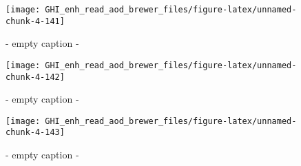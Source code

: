 \documentclass[
  10pt,
  a4paper,oneside]{article}
\begin{document}
\begin{figure}[H]

{\centering \texttt{[image: GHI\_enh\_read\_aod\_brewer\_files/figure-latex/unnamed-chunk-4-141]} 

}

\caption{ - empty caption - }\label{fig:unnamed-chunk-4-141}
\end{figure}
\begin{figure}[H]

{\centering \texttt{[image: GHI\_enh\_read\_aod\_brewer\_files/figure-latex/unnamed-chunk-4-142]} 

}

\caption{ - empty caption - }\label{fig:unnamed-chunk-4-142}
\end{figure}
\begin{figure}[H]

{\centering \texttt{[image: GHI\_enh\_read\_aod\_brewer\_files/figure-latex/unnamed-chunk-4-143]} 

}

\caption{ - empty caption - }\label{fig:unnamed-chunk-4-143}
\end{figure}
\end{document}
